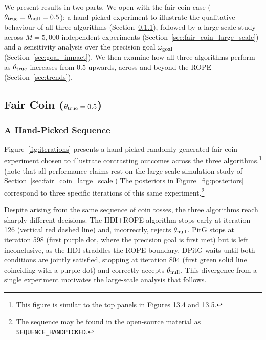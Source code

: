 We present results in two parts.
We open with the fair coin case ($\theta_{\rm true}=\theta_{\rm null}=0.5$):
a hand-picked experiment to illustrate the qualitative behaviour of all three algorithms
(Section~\ref{sec:fair_coin_sequence}), followed by a large-scale study across
$M=5{,}000$ independent experiments (Section~\ref{sec:fair_coin_large_scale}) and a
sensitivity analysis over the precision goal $\omega_{\rm goal}$
(Section~\ref{sec:goal_impact}).
We then examine how all three algorithms perform as $\theta_{\rm true}$ increases from
$0.5$ upwards, across and beyond the ROPE (Section~\ref{sec:trends}).

\subsection{Fair Coin ($\theta_{\rm true}=0.5$)}\label{sec:fair_coin}

\subsubsection{A Hand-Picked Sequence}\label{sec:fair_coin_sequence}

Figure~\ref{fig:iterations} presents a hand-picked randomly generated fair coin experiment chosen to
illustrate contrasting outcomes across the three algorithms.\footnote{This figure is similar to the top
panels in \cite{kruschke2015doing} Figures 13.4 and 13.5.}
(note that all performance claims rest on the large-scale simulation study of
Section~\ref{sec:fair_coin_large_scale})
The posteriors in Figure~\ref{fig:posteriors} correspond to three specific iterations
of this same experiment.\footnote{The sequence may be found in the open-source material
as \href{https://github.com/elzurdo/precision-goal/blob/main/py/utils_experiments.py\#L28}{\texttt{SEQUENCE\_HANDPICKED}}.}

Despite arising from the same sequence of coin tosses, the three algorithms reach
sharply different decisions.
The HDI+ROPE algorithm stops early at iteration 126 (vertical red dashed line) and, incorrectly,
rejects $\theta_{\rm null}$.
PitG stops at iteration 598 (first purple dot, where the precision goal is first met)
but is left inconclusive, as the HDI straddles the ROPE boundary.
DPitG waits until both conditions are jointly satisfied, stopping at iteration 804
(first green solid line coinciding with a purple dot) and correctly accepts
$\theta_{\rm null}$.
This divergence from a single experiment motivates the large-scale analysis that
follows.


